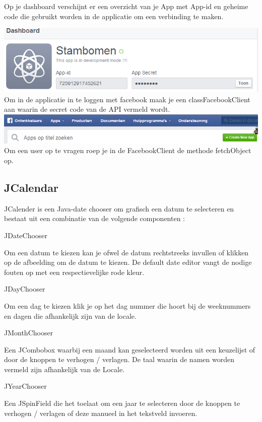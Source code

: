 \documentclass[pdftex,a4paper,12pt,twoside]{report}
\begin{document}
 Op je dashboard verschijnt er een overzicht van je App met App-id en geheime code die gebruikt worden in de applicatie om een verbinding te maken.
 
 \includegraphics{images/facebook3.png}\\
 
Om in de applicatie in te loggen met facebook maak je een classFacebookClient aan waarin de secret code van de API vermeld wordt.
\includegraphics{images/facebook4.png}\\

Om een user op te vragen roep je in de FacebookClient de methode fetchObject op.

 

\subsection{JCalendar}
JCalender is een Java-date chooser om grafisch een datum te selecteren en bestaat uit een combinatie van de volgende componenten :

JDateChooser

Om een datum te kiezen kan je ofwel de datum rechtstreeks invullen of klikken op de afbeelding om de datum te kiezen.
De default date editor vangt de nodige fouten op met een respectievelijke rode kleur.


JDayChooser

Om een dag te kiezen klik je op het dag nummer die hoort bij de weeknummers en dagen die afhankelijk zijn van de locale.



JMonthChooser

Een JCombobox  waarbij een maand kan geselecteerd worden uit een keuzelijst of door de knoppen te verhogen / verlagen. De taal waarin de namen worden vermeld zijn afhankelijk van de Locale.
 
JYearChooser

Een JSpinField die het toelaat om een jaar te selecteren door de knoppen te verhogen / verlagen of deze manueel in het tekstveld invoeren.
\end{document}
